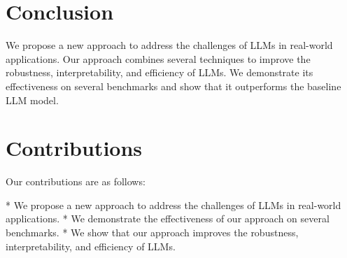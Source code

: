 \documentclass{article}
\begin{document}
\section{Conclusion}
We propose a new approach to address the challenges of LLMs in real-world applications. Our approach combines several techniques to improve the robustness, interpretability, and efficiency of LLMs. We demonstrate its effectiveness on several benchmarks and show that it outperforms the baseline LLM model.

\section{Contributions}
Our contributions are as follows:

* We propose a new approach to address the challenges of LLMs in real-world applications.
* We demonstrate the effectiveness of our approach on several benchmarks.
* We show that our approach improves the robustness, interpretability, and efficiency of LLMs.
\end{document}
